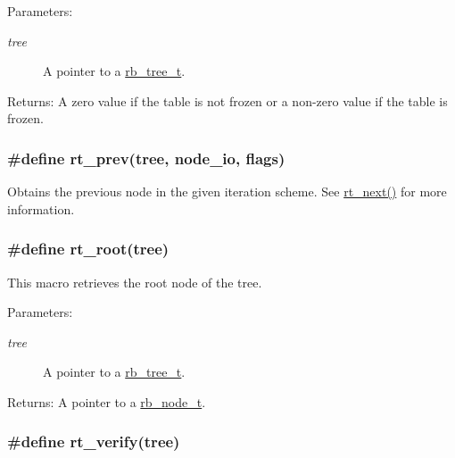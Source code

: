 \begin{Desc}
\item[Parameters:]
\begin{description}
\item[{\em tree}]A pointer to a \hyperlink{group__dbprim__rbtree_a0}{rb\_\-tree\_\-t}.\end{description}
\end{Desc}
\begin{Desc}
\item[Returns:]A zero value if the table is not frozen or a non-zero value if the table is frozen. \end{Desc}
\hypertarget{group__dbprim__rbtree_a24}{
\subsubsection[rt\_\-prev]{\setlength{\rightskip}{0pt plus 5cm}\#define rt\_\-prev(tree, node\_\-io, flags)}}
\label{group__dbprim__rbtree_a24}


Obtains the previous node in the given iteration scheme. See \hyperlink{group__dbprim__rbtree_a10}{rt\_\-next()} for more information. \hypertarget{group__dbprim__rbtree_a18}{
\subsubsection[rt\_\-root]{\setlength{\rightskip}{0pt plus 5cm}\#define rt\_\-root(tree)}}
\label{group__dbprim__rbtree_a18}


This macro retrieves the root node of the tree.

\begin{Desc}
\item[Parameters:]
\begin{description}
\item[{\em tree}]A pointer to a \hyperlink{group__dbprim__rbtree_a0}{rb\_\-tree\_\-t}.\end{description}
\end{Desc}
\begin{Desc}
\item[Returns:]A pointer to a \hyperlink{group__dbprim__rbtree_a1}{rb\_\-node\_\-t}. \end{Desc}
\hypertarget{group__dbprim__rbtree_a15}{
\subsubsection[rt\_\-verify]{\setlength{\rightskip}{0pt plus 5cm}\#define rt\_\-verify(tree)}}
\label{group__dbprim__rbtree_a15}


